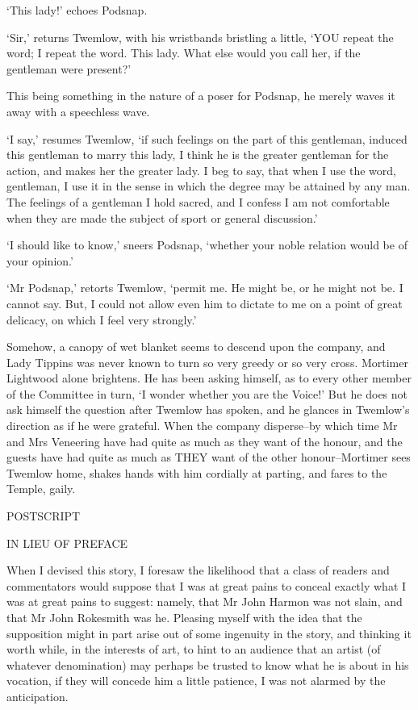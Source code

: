 ‘This lady!’ echoes Podsnap.

‘Sir,’ returns Twemlow, with his wristbands bristling a little, ‘YOU
repeat the word; I repeat the word. This lady. What else would you call
her, if the gentleman were present?’

This being something in the nature of a poser for Podsnap, he merely
waves it away with a speechless wave.

‘I say,’ resumes Twemlow, ‘if such feelings on the part of this
gentleman, induced this gentleman to marry this lady, I think he is the
greater gentleman for the action, and makes her the greater lady. I beg
to say, that when I use the word, gentleman, I use it in the sense in
which the degree may be attained by any man. The feelings of a gentleman
I hold sacred, and I confess I am not comfortable when they are made the
subject of sport or general discussion.’

‘I should like to know,’ sneers Podsnap, ‘whether your noble relation
would be of your opinion.’

‘Mr Podsnap,’ retorts Twemlow, ‘permit me. He might be, or he might not
be. I cannot say. But, I could not allow even him to dictate to me on a
point of great delicacy, on which I feel very strongly.’

Somehow, a canopy of wet blanket seems to descend upon the company, and
Lady Tippins was never known to turn so very greedy or so very cross.
Mortimer Lightwood alone brightens. He has been asking himself, as to
every other member of the Committee in turn, ‘I wonder whether you are
the Voice!’ But he does not ask himself the question after Twemlow has
spoken, and he glances in Twemlow’s direction as if he were grateful.
When the company disperse--by which time Mr and Mrs Veneering have had
quite as much as they want of the honour, and the guests have had quite
as much as THEY want of the other honour--Mortimer sees Twemlow home,
shakes hands with him cordially at parting, and fares to the Temple,
gaily.



POSTSCRIPT

IN LIEU OF PREFACE


When I devised this story, I foresaw the likelihood that a class of
readers and commentators would suppose that I was at great pains to
conceal exactly what I was at great pains to suggest: namely, that Mr
John Harmon was not slain, and that Mr John Rokesmith was he. Pleasing
myself with the idea that the supposition might in part arise out
of some ingenuity in the story, and thinking it worth while, in the
interests of art, to hint to an audience that an artist (of whatever
denomination) may perhaps be trusted to know what he is about in his
vocation, if they will concede him a little patience, I was not alarmed
by the anticipation.

